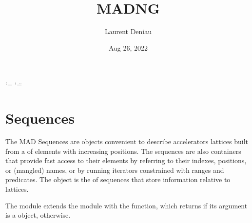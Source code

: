 \documentclass[letterpaper,10pt,english]{sphinxmanual}
\title{MAD\sphinxhyphen{}NG}
\date{Aug 26, 2022}
\author{Laurent Deniau}
\begin{document}
\ifdefined\shorthandoff
  \ifnum\catcode`\=\string=\active\shorthandoff{=}\fi
  \ifnum\catcode`\"=\active{}\fi
\fi

\pagestyle{empty}
\sphinxmaketitle
\pagestyle{plain}
\sphinxtableofcontents
\pagestyle{normal}
\label{\detokenize{index::doc}}


\sphinxstepscope


\chapter{Sequences}
\label{\detokenize{sequences:sequences}}\label{\detokenize{sequences::doc}}
\sphinxAtStartPar
The MAD Sequences are objects convenient to describe accelerators lattices built from a  of elements with increasing \sphinxhyphen{}positions. The sequences are also containers that provide fast access to their elements by referring to their indexes, \sphinxhyphen{}positions, or (mangled) names, or by running iterators constrained with ranges and predicates.
The  object is the  of sequences that store information relative to lattices.

\sphinxAtStartPar
The  module extends the {\hyperref[\detokenize{types::doc}]{}} module with the  function, which returns  if its argument is a  object,  otherwise.
\end{document}
